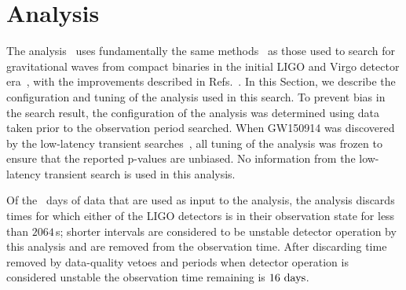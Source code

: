 \section{\pycbc{} Analysis}
\label{s:pycbc}

The \pycbc{} analysis~\cite{Canton:2014ena,Usman:2015kfa,pycbc-github}  uses
fundamentally the same
methods~\cite{Brown:2004pv,Allen:2005fk,Allen:2004gu,Brown:2005zs,Babak:2012zx,Brown:workflow,deelman2005pegasus,deelman2015pegasus,condor-practice,condor-dagman}
as those used to search for gravitational waves from compact binaries in the
initial LIGO and Virgo detector
era~\cite{Abbott:2003pj,Abbott:2005pe,Abbott:2005pf,Abbott:2005kq,Abbott:2007xi,Abbott:2007ai,Abbott:2009tt,Abbott:2009qj,Abadie:2010yba,Colaboration:2011np,Aasi:2012rja,Aasi:2014bqj},
with the improvements described in Refs.~\cite{Canton:2014ena,Usman:2015kfa}.
In this Section, we describe the configuration and tuning of the \pycbc{}
analysis used in this search.  To prevent bias in the search result, the
configuration of the analysis was determined using data taken prior to the
observation period searched. When GW150914 was discovered by the low-latency
transient searches~\cite{GW150914-DETECTION}, all tuning of the \pycbc{}
analysis was frozen to ensure that the reported p-values are
unbiased. No information from the low-latency transient search is used in this
analysis.

Of the \TotalCoincAfterCATOne~days of data that are used as input to the
analysis, the \pycbc{} analysis discards times for which either of the LIGO
detectors is in their observation state for less than $2064$\,s; shorter
intervals are considered to be unstable detector operation by this analysis
and are removed from the observation time. After discarding time removed by
data-quality vetoes and periods when detector operation is considered unstable
the observation time remaining is $16~\mathrm{days}$.

